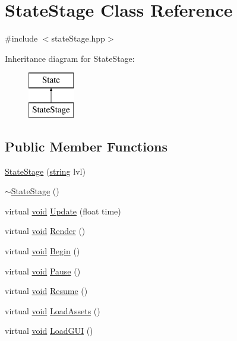 \hypertarget{class_state_stage}{\section{State\-Stage Class Reference}
\label{class_state_stage}
}


{\ttfamily \#include $<$state\-Stage.\-hpp$>$}

Inheritance diagram for State\-Stage\-:\begin{figure}[H]
\begin{center}
\leavevmode
\includegraphics[height=2.000000cm]{class_state_stage}
\end{center}
\end{figure}
\subsection*{Public Member Functions}
\begin{DoxyCompactItemize}
\item 
\hyperlink{class_state_stage_a1c0232e857391295417b6e2ca15a84ca}{State\-Stage} (\hyperlink{_s_d_l__opengl__glext_8h_ae84541b4f3d8e1ea24ec0f466a8c568b}{string} lvl)
\item 
\hyperlink{class_state_stage_a19b9b4c4469e82064015adc4157b855f}{$\sim$\-State\-Stage} ()
\item 
virtual \hyperlink{_s_d_l__opengles2__gl2ext_8h_ae5d8fa23ad07c48bb609509eae494c95}{void} \hyperlink{class_state_stage_a80984c55012d74f3eb0b0318d8f6511a}{Update} (float time)
\item 
virtual \hyperlink{_s_d_l__opengles2__gl2ext_8h_ae5d8fa23ad07c48bb609509eae494c95}{void} \hyperlink{class_state_stage_a4dac7e9dbec93f8d5ecfa1088796590c}{Render} ()
\item 
virtual \hyperlink{_s_d_l__opengles2__gl2ext_8h_ae5d8fa23ad07c48bb609509eae494c95}{void} \hyperlink{class_state_stage_a544c8819debc2743421875dc31b3f86f}{Begin} ()
\item 
virtual \hyperlink{_s_d_l__opengles2__gl2ext_8h_ae5d8fa23ad07c48bb609509eae494c95}{void} \hyperlink{class_state_stage_a34ce42b989207bc65e7d8edbd86a8fb6}{Pause} ()
\item 
virtual \hyperlink{_s_d_l__opengles2__gl2ext_8h_ae5d8fa23ad07c48bb609509eae494c95}{void} \hyperlink{class_state_stage_ae396effb4e08200f70f4901f1b204b58}{Resume} ()
\item 
virtual \hyperlink{_s_d_l__opengles2__gl2ext_8h_ae5d8fa23ad07c48bb609509eae494c95}{void} \hyperlink{class_state_stage_ae0fc7ce84564739a118facc3337d035f}{Load\-Assets} ()
\item 
virtual \hyperlink{_s_d_l__opengles2__gl2ext_8h_ae5d8fa23ad07c48bb609509eae494c95}{void} \hyperlink{class_state_stage_a21efc84369e3a1f378ce56187fd63691}{Load\-G\-U\-I} ()
\end{DoxyCompactItemize}
